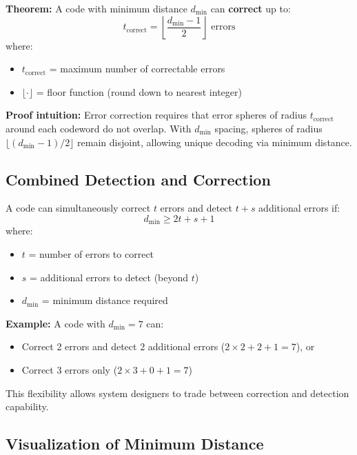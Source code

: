\textbf{Theorem:} A code with minimum distance $d_{\min}$ can \textbf{correct} up to:
\begin{equation}
t_{\text{correct}} = \left\lfloor \frac{d_{\min} - 1}{2} \right\rfloor \text{ errors}
\label{eq:correct-capability}
\end{equation}
where:
\begin{itemize}
\item $t_{\text{correct}}$ = maximum number of correctable errors
\item $\lfloor \cdot \rfloor$ = floor function (round down to nearest integer)
\end{itemize}

\textbf{Proof intuition:} Error correction requires that error spheres of radius $t_{\text{correct}}$ around each codeword do not overlap. With $d_{\min}$ spacing, spheres of radius $\lfloor(d_{\min} - 1)/2\rfloor$ remain disjoint, allowing unique decoding via minimum distance.

\subsection{Combined Detection and Correction}

A code can simultaneously correct $t$ errors and detect $t + s$ additional errors if:
\begin{equation}
d_{\min} \geq 2t + s + 1
\label{eq:combined-capability}
\end{equation}
where:
\begin{itemize}
\item $t$ = number of errors to correct
\item $s$ = additional errors to detect (beyond $t$)
\item $d_{\min}$ = minimum distance required
\end{itemize}

\textbf{Example:} A code with $d_{\min} = 7$ can:
\begin{itemize}
\item Correct 2 errors and detect 2 additional errors ($2 \times 2 + 2 + 1 = 7$), or
\item Correct 3 errors only ($2 \times 3 + 0 + 1 = 7$)
\end{itemize}

This flexibility allows system designers to trade between correction and detection capability.

\subsection{Visualization of Minimum Distance}

